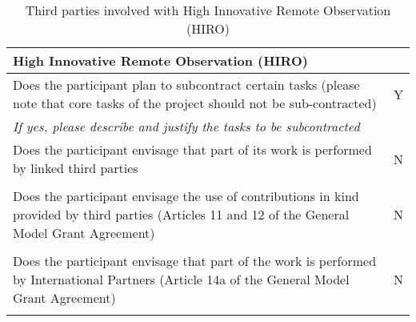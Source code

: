 \begin{table}[H]
	\centering
	\begin{tabular}{|p{10cm}|p{4cm}|}
		\hline
		
		\multicolumn{2}{|p{14cm}|}{\textbf{High Innovative Remote Observation (HIRO)}}\\
		
		\hline
		
		Does the participant plan to subcontract certain tasks (please note that core tasks of the project should not be sub-contracted) & Y\\
		
		\hline
		
		\multicolumn{2}{|p{14cm}|}{\textit{If yes, please describe and justify the tasks to be subcontracted}}\\
		
		\hline
		
		Does the participant envisage that part of its work is performed by linked third parties & N\\
		
		\hline
		
		\multicolumn{2}{|p{14cm}|}{}\\
		
		\hline
		
		Does the participant envisage the use of contributions in kind provided by third parties (Articles 11 and 12 of the General Model Grant Agreement) & N\\
		
		\hline
		
		\multicolumn{2}{|p{14cm}|}{}\\
		
		\hline
		
		Does the participant envisage that part of the work is performed by International Partners (Article 14a of the General Model Grant Agreement) & N\\
		
		\hline
		
		\multicolumn{2}{|p{14cm}|}{}\\
		
		\hline
	\end{tabular}
	\caption{Third parties involved with High Innovative Remote Observation (HIRO)}
\end{table}




